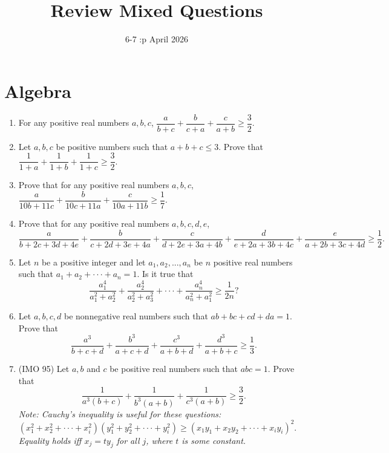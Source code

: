 \documentclass[12pt]{article}
\begin{document}
\title{Review Mixed Questions}
\date{6-7 :p April 2026}
\maketitle


\section*{Algebra}

\begin{enumerate}
    \item For any positive real numbers $a, b, c$, $\dfrac{a}{b+c}+\dfrac{b}{c+a}+\dfrac{c}{a+b}\ge\dfrac{3}{2}.$
    
    \item Let $a, b, c$ be positive numbers such that $a+b+c\le3$. Prove that $\dfrac{1}{1+a}+\dfrac{1}{1+b}+\dfrac{1}{1+c}\ge\dfrac{3}{2}.$
    
    \item Prove that for any positive real numbers $a, b, c$, $\dfrac{a}{10b+11c}+\dfrac{b}{10c+11a}+\dfrac{c}{10a+11b}\ge\dfrac{1}{7}.$
    
    \item Prove that for any positive real numbers $a, b, c, d, e$, 
    $$\dfrac{a}{b+2c+3d+4e}+\dfrac{b}{c+2d+3e+4a}+\dfrac{c}{d+2e+3a+4b}+\dfrac{d}{e+2a+3b+4c}+\dfrac{e}{a+2b+3c+4d}\ge\dfrac{1}{2}.$$
    
    \item Let $n$ be a positive integer and let $a_{1},a_{2},...,a_{n}$ be $n$ positive real numbers such that $a_{1}+a_{2}+\cdot\cdot\cdot+a_{n}=1$. Is it true that 
    $$\dfrac{a_{1}^{4}}{a_{1}^{2}+a_{2}^{2}}+\dfrac{a_{2}^{4}}{a_{2}^{2}+a_{3}^{2}}+\cdot\cdot\cdot+\dfrac{a_{n}^{4}}{a_{n}^{2}+a_{1}^{2}}\ge\dfrac{1}{2n}?$$
    
    \item Let $a, b, c, d$ be nonnegative real numbers such that $ab+bc+cd+da=1$. Prove that 
    $$\dfrac{a^{3}}{b+c+d}+\dfrac{b^{3}}{a+c+d}+\dfrac{c^{3}}{a+b+d}+\dfrac{d^{3}}{a+b+c}\ge\dfrac{1}{3}.$$
    
    \item (IMO 95) Let $a, b$ and $c$ be positive real numbers such that $abc=1$. Prove that 
    $$\dfrac{1}{a^{3}(b+c)}+\dfrac{1}{b^{3}(a+b)}+\dfrac{1}{c^{3}(a+b)}\ge\dfrac{3}{2}.$$
    \textit{Note: Cauchy's inequality is useful for these questions: $(x_{1}^{2}+x_{2}^{2}+\cdot\cdot\cdot+x_{i}^{2})(y_{1}^{2}+y_{2}^{2}+\cdot\cdot\cdot+y_{i}^{2})\ge(x_{1}y_{1}+x_{2}y_{2}+\cdot\cdot\cdot+x_{i}y_{i})^{2}.$ Equality holds iff $x_{j}=ty_{j}$ for all $j$, where $t$ is some constant.}


\end{enumerate}
\end{document}
